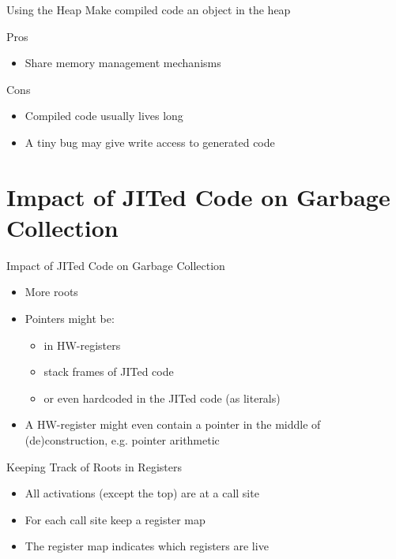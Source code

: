 \documentclass[
14pt,
aspectratio=169,
usenames,
dvipsnames,
x11names]{beamer}
\newcommand{\tik}[0]{{\color{YellowGreen}\Checkmark}} %
\newcommand{\ex}[0]{{\color{BrickRed}\XSolidBrush}}  %
\begin{document}
\begin{frame}{Using the Heap}
  Make compiled code an object in the heap

  \vfill

  Pros \tik
  \begin{itemize}
  \item \alert{Share} memory management mechanisms
  \end{itemize}

  \vfill

  Cons \ex
  \begin{itemize}
  \item Compiled code usually \alert{lives long}
  \item A tiny bug may give \alert{write access to generated code}
  \end{itemize}
\end{frame}

\section{Impact of JITed Code on Garbage Collection}

\begin{frame}{Impact of JITed Code on Garbage Collection}
  \begin{itemize}  \setlength{\itemsep}{\fill}
  \item \alert{More} roots
  \item Pointers might be:
    \begin{itemize}
    \item in \alert{HW-registers}
    \item \alert{stack frames} of JITed code
    \item or even \alert{hardcoded} in the JITed code (as literals)
    \end{itemize}
  \item A HW-register might even contain a pointer in the middle of (de)construction, e.g. pointer arithmetic
  \end{itemize}
\end{frame}

\begin{frame}{Keeping Track of Roots in Registers}
  \begin{itemize}  \setlength{\itemsep}{\fill}
  \item All activations (except the top) are at a \alert{call site}
  \item For each call site keep a \alert{register map}
  \item The register map indicates which registers are live
  \end{itemize}
\end{frame}
\end{document}
